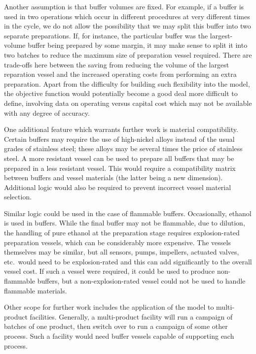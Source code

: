 Another assumption is that buffer volumes are fixed.
For example, if a buffer is used in two operations which occur in different
procedures at very different times in the cycle, we do not allow the
possibility that we may split this buffer into two separate preparations.
If, for instance, the particular buffer was the largest-volume buffer being
prepared by some margin, it may make sense to split it into two batches to
reduce the maximum size of preparation vessel required.
There are trade-offs here between the saving from reducing the volume of the
largest reparation vessel and the increased operating costs from performing an
extra preparation.
Apart from the difficulty for building such flexibility into the model, the
objective function would potentially become a good deal more difficult to
define, involving data on operating versus capital cost which may not be
available with any degree of accuracy.

One additional feature which warrants further work is material compatibility.
Certain buffers may require the use of high-nickel alloys instead of the
usual grades of stainless steel; these alloys may be several times the price
of stainless steel.
A more resistant vessel can be used to prepare all buffers that may be prepared
in a less resistant vessel.
This would require a compatibility matrix between buffers and vessel materials
(the latter being a new dimension).
Additional logic would also be required to prevent incorrect vessel material
selection.

Similar logic could be used in the case of flammable buffers.
Occasionally, ethanol is used in buffers. While the final buffer may not be
flammable, due to dilution, the handling of pure ethanol at the preparation
stage requires explosion-rated preparation vessels, which can be considerably
more expensive.
The vessels themselves may be similar, but all sensors, pumps, impellers,
actuated valves, etc.\ would need to be explosion-rated and this can add
significantly to the overall vessel cost.
If such a vessel were required, it could be used to produce non-flammable
buffers, but a non-explosion-rated vessel could not be used to handle flammable
materials.

Other scope for further work includes the application of the model to
multi-product facilities.
Generally, a multi-product facility will run a campaign of batches of one
product, then switch over to run a campaign of some other process.
Such a facility would need buffer vessels capable of supporting each process.
